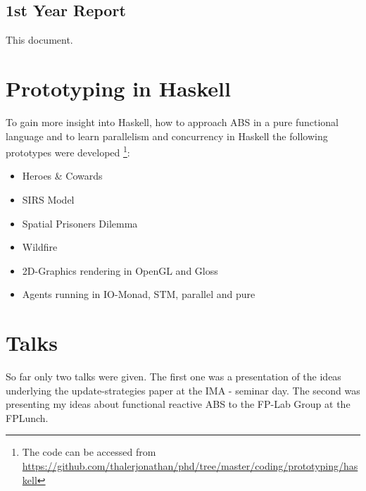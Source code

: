 \subsection{1st Year Report}
This document.

\section{Prototyping in Haskell}
To gain more insight into Haskell, how to approach ABS in a pure functional language and to learn parallelism and concurrency in Haskell the following prototypes were developed \footnote{The code can be accessed from \url{https://github.com/thalerjonathan/phd/tree/master/coding/prototyping/haskell}}:

\begin{itemize}
	\item Heroes \& Cowards 
	\item SIRS Model
	\item Spatial Prisoners Dilemma
	\item Wildfire
	\item 2D-Graphics rendering in OpenGL and Gloss 
	\item Agents running in IO-Monad, STM, parallel and pure
\end{itemize}

\section{Talks}
So far only two talks were given. The first one was a presentation of the ideas underlying the update-strategies paper at the IMA - seminar day. The second was presenting my ideas about functional reactive ABS to the FP-Lab Group at the FPLunch.